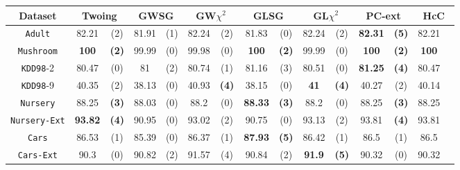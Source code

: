 \begin{sidewaystable*}[ph!]
\centering
\begin{tabular}{c|cc|cc|cc|cc|cc|cc|cc} 
Dataset & \multicolumn{2}{c|}{Twoing} &  \multicolumn{2}{c|}{GWSG}  
&   \multicolumn{2}{c|}{GW$\chi^2$}                   &\multicolumn{2}{c|}{GLSG}       &\multicolumn{2}{c|}{GL$\chi^2$} & \multicolumn{2}{c|}{PC-ext} & \multicolumn{2}{c}{HcC}\\  \hline 
{\tt Adult}         & 82.21    & (2)    & 81.91    & (1)    & 82.24    & (2)    & 81.83    & (0)    & 82.24    & (2)    &{\bf82.31}&{\bf(5)}         & 82.21    &    \\
{\tt Mushroom}      & {\bf 100}&{\bf(2)}& 99.99    & (0)    & 99.98    & (0)    &{\bf  100}&{\bf(2)}& 99.99    & (0)    &{\bf 100} &{\bf(2)}         &{\bf100}  &    \\
{\tt KDD98}-2       & 80.47    & (0)    & 81       & (2)    & 80.74    & (1)    & 81.16    & (3)    & 80.51    & (0)    &{\bf81.25}&{\bf(4)}         & 80.47    &    \\
{\tt KDD98}-9       & 40.35    & (2)    & 38.13    & (0)    & 40.93    &{\bf(4)}& 38.15    & (0)    &{\bf 41 } &{\bf(4)}& 40.27    & (2)             & 40.14    &    \\
{\tt Nursery}       & 88.25    &{\bf(3)}& 88.03    & (0)    & 88.2     & (0)    &{\bf88.33}&{\bf(3)}& 88.2     & (0)    & 88.25    &{\bf(3)}         & 88.25    &    \\
{\tt Nursery-Ext}   &{\bf93.82}&{\bf(4)}& 90.95    & (0)    & 93.02    & (2)    & 90.75    & (0)    & 93.13    & (2)    & 93.81    &{\bf(4)}         & 93.81    &    \\
{\tt Cars}          & 86.53    & (1)    & 85.39    & (0)    & 86.37    & (1)    &{\bf87.93}&{\bf(5)}& 86.42    & (1)    & 86.5     & (1)             & 86.5     &    \\
{\tt Cars-Ext}      & 90.3     & (0)    & 90.82    & (2)    & 91.57    & (4)    & 90.84    & (2)    &{\bf 91.9}&{\bf(5)}& 90.32    & (0)             & 90.32    &    \\

\end{tabular}
\end{sidewaystable*}
